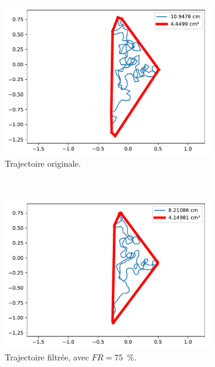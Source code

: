 	\begin{figure}[!htb]
		\begin{subfigure}[t]{0.49\textwidth}
			\centering
			\includegraphics[width=\textwidth]{figures/ch5/2_19_SpeedReduction_2_19_120_32}
			\caption{Trajectoire originale.}
			\label{fig:speedRedOriginal}
		\end{subfigure}
		~
		\begin{subfigure}[t]{0.49\textwidth}
			\centering
			\includegraphics[width=\textwidth]{figures/ch5/2_19_SpeedReduction_2_19_120_32_factor_0_75}
			\caption{Trajectoire filtrée, avec $FR = 75$~\%{}.}
			\label{fig:speedRed075}
		\end{subfigure}
		~
		\begin{subfigure}[t]{0.49\textwidth}

\end{subfigure}
\end{figure}
